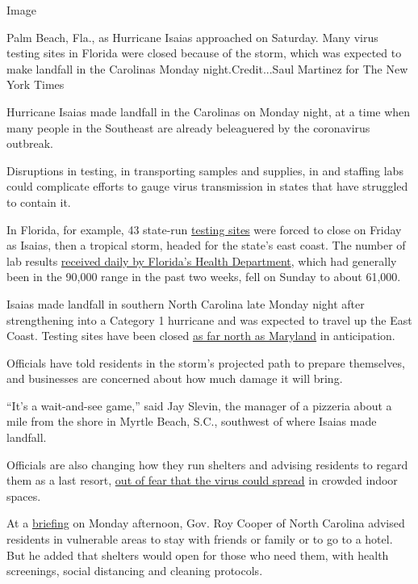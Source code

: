 Image

Palm Beach, Fla., as Hurricane Isaias approached on Saturday. Many virus
testing sites in Florida were closed because of the storm, which was
expected to make landfall in the Carolinas Monday night.Credit...Saul
Martinez for The New York Times

Hurricane Isaias made landfall in the Carolinas on Monday night, at a
time when many people in the Southeast are already beleaguered by the
coronavirus outbreak.

Disruptions in testing, in transporting samples and supplies, in and
staffing labs could complicate efforts to gauge virus transmission in
states that have struggled to contain it.

In Florida, for example, 43 state-run
\href{https://floridadisaster.org/covid19/testing-sites/}{testing sites}
were forced to close on Friday as Isaias, then a tropical storm, headed
for the state's east coast. The number of lab results
\href{http://ww11.doh.state.fl.us/comm/_partners/covid19_report_archive/state_reports_latest.pdf}{received
daily by Florida's Health Department}, which had generally been in the
90,000 range in the past two weeks, fell on Sunday to about 61,000.

Isaias made landfall in southern North Carolina late Monday night after
strengthening into a Category 1 hurricane and was expected to travel up
the East Coast. Testing sites have been closed
\href{https://patch.com/maryland/baltimore/tropical-storm-isaias-closes-14-md-coronavirus-testing-sites}{as
far north as Maryland} in anticipation.

Officials have told residents in the storm's projected path to prepare
themselves, and businesses are concerned about how much damage it will
bring.

``It's a wait-and-see game,'' said Jay Slevin, the manager of a pizzeria
about a mile from the shore in Myrtle Beach, S.C., southwest of where
Isaias made landfall.

Officials are also changing how they run shelters and advising residents
to regard them as a last resort,
\href{https://www.nytimes3xbfgragh.onion/2020/07/26/us/virus-texas-storm.html}{out
of fear that the virus could spread} in crowded indoor spaces.

At a
\href{https://www.ncdps.gov/storm-update?fbclid=IwAR3gtINKPXqQdsJixuf1kwBKbAtEMz62wzyoDHlu7FDBN1HTarDlw8FlVwQ}{briefing}
on Monday afternoon, Gov. Roy Cooper of North Carolina advised residents
in vulnerable areas to stay with friends or family or to go to a hotel.
But he added that shelters would open for those who need them, with
health screenings, social distancing and cleaning protocols.

